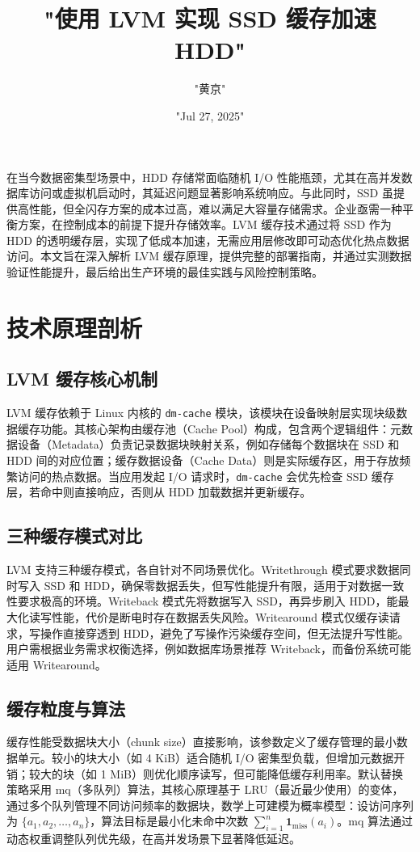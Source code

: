 \title{"使用 LVM 实现 SSD 缓存加速 HDD"}
\author{"黄京"}
\date{"Jul 27, 2025"}
\maketitle
在当今数据密集型场景中，HDD 存储常面临随机 I/O 性能瓶颈，尤其在高并发数据库访问或虚拟机启动时，其延迟问题显著影响系统响应。与此同时，SSD 虽提供高性能，但全闪存方案的成本过高，难以满足大容量存储需求。企业亟需一种平衡方案，在控制成本的前提下提升存储效率。LVM 缓存技术通过将 SSD 作为 HDD 的透明缓存层，实现了低成本加速，无需应用层修改即可动态优化热点数据访问。本文旨在深入解析 LVM 缓存原理，提供完整的部署指南，并通过实测数据验证性能提升，最后给出生产环境的最佳实践与风险控制策略。\par
\chapter{技术原理剖析}
\section{LVM 缓存核心机制}
LVM 缓存依赖于 Linux 内核的 \texttt{dm-cache} 模块，该模块在设备映射层实现块级数据缓存功能。其核心架构由缓存池（Cache Pool）构成，包含两个逻辑组件：元数据设备（Metadata）负责记录数据块映射关系，例如存储每个数据块在 SSD 和 HDD 间的对应位置；缓存数据设备（Cache Data）则是实际缓存区，用于存放频繁访问的热点数据。当应用发起 I/O 请求时，\texttt{dm-cache} 会优先检查 SSD 缓存层，若命中则直接响应，否则从 HDD 加载数据并更新缓存。\par
\section{三种缓存模式对比}
LVM 支持三种缓存模式，各自针对不同场景优化。Writethrough 模式要求数据同时写入 SSD 和 HDD，确保零数据丢失，但写性能提升有限，适用于对数据一致性要求极高的环境。Writeback 模式先将数据写入 SSD，再异步刷入 HDD，能最大化读写性能，代价是断电时存在数据丢失风险。Writearound 模式仅缓存读请求，写操作直接穿透到 HDD，避免了写操作污染缓存空间，但无法提升写性能。用户需根据业务需求权衡选择，例如数据库场景推荐 Writeback，而备份系统可能适用 Writearound。\par
\section{缓存粒度与算法}
缓存性能受数据块大小（chunk size）直接影响，该参数定义了缓存管理的最小数据单元。较小的块大小（如 4 KiB）适合随机 I/O 密集型负载，但增加元数据开销；较大的块（如 1 MiB）则优化顺序读写，但可能降低缓存利用率。默认替换策略采用 mq（多队列）算法，其核心原理基于 LRU（最近最少使用）的变体，通过多个队列管理不同访问频率的数据块，数学上可建模为概率模型：设访问序列为 $\{a_1, a_2, \ldots, a_n\}$，算法目标是最小化未命中次数 $\sum_{i=1}^n \mathbf{1}_{\text{miss}}(a_i)$。mq 算法通过动态权重调整队列优先级，在高并发场景下显著降低延迟。\par

